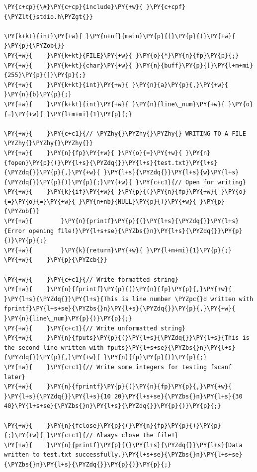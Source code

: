 \begin{Verbatim}[label=\makebox{\url{https://github.com/lucabaldini/cmepda/tree/master/slides/latex/snippets/file_io.c}},commandchars=\\\{\}]
\PY{c+cp}{\#}\PY{c+cp}{include}\PY{+w}{ }\PY{c+cpf}{\PYZlt{}stdio.h\PYZgt{}}

\PY{k+kt}{int}\PY{+w}{ }\PY{n+nf}{main}\PY{p}{(}\PY{p}{)}\PY{+w}{ }\PY{p}{\PYZob{}}
\PY{+w}{    }\PY{k+kt}{FILE}\PY{+w}{ }\PY{o}{*}\PY{n}{fp}\PY{p}{;}
\PY{+w}{    }\PY{k+kt}{char}\PY{+w}{ }\PY{n}{buff}\PY{p}{[}\PY{l+m+mi}{255}\PY{p}{]}\PY{p}{;}
\PY{+w}{    }\PY{k+kt}{int}\PY{+w}{ }\PY{n}{a}\PY{p}{,}\PY{+w}{ }\PY{n}{b}\PY{p}{;}
\PY{+w}{    }\PY{k+kt}{int}\PY{+w}{ }\PY{n}{line\_num}\PY{+w}{ }\PY{o}{=}\PY{+w}{ }\PY{l+m+mi}{1}\PY{p}{;}

\PY{+w}{    }\PY{c+c1}{// \PYZhy{}\PYZhy{}\PYZhy{} WRITING TO A FILE \PYZhy{}\PYZhy{}\PYZhy{}}
\PY{+w}{    }\PY{n}{fp}\PY{+w}{ }\PY{o}{=}\PY{+w}{ }\PY{n}{fopen}\PY{p}{(}\PY{l+s}{\PYZdq{}}\PY{l+s}{test.txt}\PY{l+s}{\PYZdq{}}\PY{p}{,}\PY{+w}{ }\PY{l+s}{\PYZdq{}}\PY{l+s}{w}\PY{l+s}{\PYZdq{}}\PY{p}{)}\PY{p}{;}\PY{+w}{ }\PY{c+c1}{// Open for writing}
\PY{+w}{    }\PY{k}{if}\PY{+w}{ }\PY{p}{(}\PY{n}{fp}\PY{+w}{ }\PY{o}{=}\PY{o}{=}\PY{+w}{ }\PY{n+nb}{NULL}\PY{p}{)}\PY{+w}{ }\PY{p}{\PYZob{}}
\PY{+w}{        }\PY{n}{printf}\PY{p}{(}\PY{l+s}{\PYZdq{}}\PY{l+s}{Error opening file!}\PY{l+s+se}{\PYZbs{}n}\PY{l+s}{\PYZdq{}}\PY{p}{)}\PY{p}{;}
\PY{+w}{        }\PY{k}{return}\PY{+w}{ }\PY{l+m+mi}{1}\PY{p}{;}
\PY{+w}{    }\PY{p}{\PYZcb{}}

\PY{+w}{    }\PY{c+c1}{// Write formatted string}
\PY{+w}{    }\PY{n}{fprintf}\PY{p}{(}\PY{n}{fp}\PY{p}{,}\PY{+w}{ }\PY{l+s}{\PYZdq{}}\PY{l+s}{This is line number \PYZpc{}d written with fprintf}\PY{l+s+se}{\PYZbs{}n}\PY{l+s}{\PYZdq{}}\PY{p}{,}\PY{+w}{ }\PY{n}{line\_num}\PY{p}{)}\PY{p}{;}
\PY{+w}{    }\PY{c+c1}{// Write unformatted string}
\PY{+w}{    }\PY{n}{fputs}\PY{p}{(}\PY{l+s}{\PYZdq{}}\PY{l+s}{This is the second line written with fputs}\PY{l+s+se}{\PYZbs{}n}\PY{l+s}{\PYZdq{}}\PY{p}{,}\PY{+w}{ }\PY{n}{fp}\PY{p}{)}\PY{p}{;}
\PY{+w}{    }\PY{c+c1}{// Write some integers for testing fscanf later}
\PY{+w}{    }\PY{n}{fprintf}\PY{p}{(}\PY{n}{fp}\PY{p}{,}\PY{+w}{ }\PY{l+s}{\PYZdq{}}\PY{l+s}{10 20}\PY{l+s+se}{\PYZbs{}n}\PY{l+s}{30 40}\PY{l+s+se}{\PYZbs{}n}\PY{l+s}{\PYZdq{}}\PY{p}{)}\PY{p}{;}

\PY{+w}{    }\PY{n}{fclose}\PY{p}{(}\PY{n}{fp}\PY{p}{)}\PY{p}{;}\PY{+w}{ }\PY{c+c1}{// Always close the file!}
\PY{+w}{    }\PY{n}{printf}\PY{p}{(}\PY{l+s}{\PYZdq{}}\PY{l+s}{Data written to test.txt successfully.}\PY{l+s+se}{\PYZbs{}n}\PY{l+s+se}{\PYZbs{}n}\PY{l+s}{\PYZdq{}}\PY{p}{)}\PY{p}{;}


\end{Verbatim}
